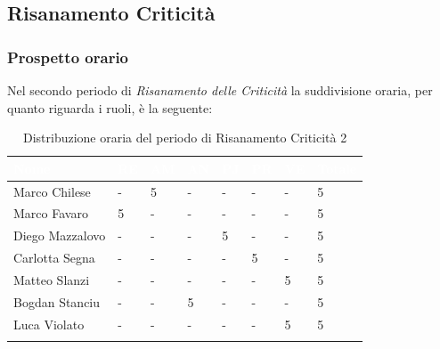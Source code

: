 \subsection{Risanamento Criticità}
\label{PRC2}

\subsubsection{Prospetto orario}
Nel secondo periodo di \textit{Risanamento delle Criticità} la suddivisione oraria, per quanto riguarda i ruoli, è la seguente: 


\begin{longtable}{|C{.30\textwidth}|C{.06\textwidth}|C{.06\textwidth}|C{.06\textwidth} | C{.06\textwidth}| C{.06\textwidth} | C{.06\textwidth} | C{.10\textwidth} |}
\hline
{}	\textbf{\textcolor{white}{Nome}} & \textbf{\textcolor{white}{RE}} & \textbf{\textcolor{white}{AM}} & \textbf{\textcolor{white}{AN}} & \textbf{\textcolor{white}{PJ}} & \textbf{\textcolor{white}{PR}} & \textbf{\textcolor{white}{VE}} & \textbf{\textcolor{white}{Totale}}\\
\hline 
Marco Chilese & - & 5 & - & - & - & - & 5 \\
\hline
{}Marco Favaro & 5 & - & - & - & - & - & 5 \\
\hline
Diego Mazzalovo & - & - & - & 5 & - & - & 5 \\
\hline
{}Carlotta Segna & - & - & - & - & 5 & - & 5 \\
\hline
Matteo Slanzi & - & - & - & - & - & 5 & 5 \\
\hline
{}Bogdan Stanciu & - & - & 5 & - & - & - & 5 \\
\hline
Luca Violato & - & - & - & - & - & 5 & 5 \\   
\hline


\caption{Distribuzione oraria del periodo di Risanamento Criticità 2}
\label{Distribuzione oraria rc2}
\end{longtable}

